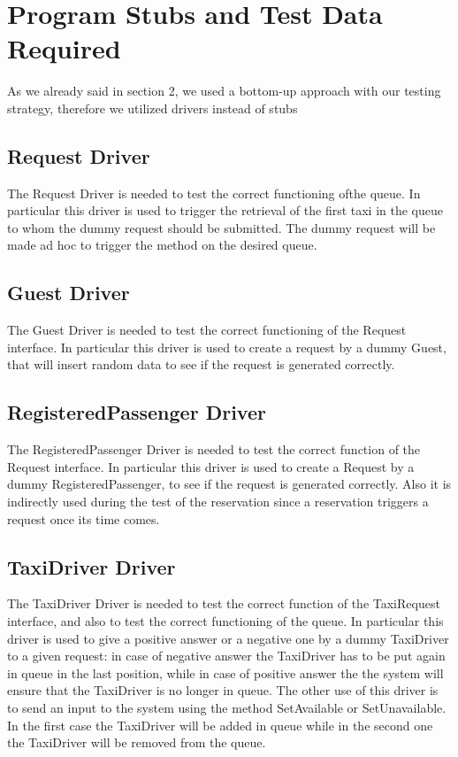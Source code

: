 \section{Program Stubs and Test Data Required}
As we already said in section 2, we used a bottom-up approach with our testing strategy,
therefore we utilized drivers instead of stubs
\subsection{Request Driver}
The Request Driver is needed to test the correct functioning ofthe queue. In particular this driver
is used to trigger the retrieval of the first taxi in the queue to whom the dummy request should be
submitted. The dummy request will be made ad hoc to trigger the method on the desired queue.
\subsection{Guest Driver}
The Guest Driver is needed to test the correct functioning of the Request interface. In particular
this driver is used to create a request by a dummy Guest, that will insert random data to see if the request
is generated correctly.
\subsection{RegisteredPassenger Driver}
The RegisteredPassenger Driver is needed to test the correct function of the Request interface.
In particular this driver is used to create a Request by a dummy RegisteredPassenger,
to see if the request is generated correctly. Also it is indirectly used during the test of
the reservation since a reservation triggers a request once its time comes.
\subsection{TaxiDriver Driver}
The TaxiDriver Driver is needed to test the correct function of the TaxiRequest interface, and also to
test the correct functioning of the queue. In particular this driver is used to give a positive answer or a negative one
by a dummy TaxiDriver to a given request: in case of negative answer the TaxiDriver has to be put again in queue in the last
position, while in case of positive answer the the system will ensure that the TaxiDriver is no longer in queue.
The other use of this driver is to send an input to the system using the method SetAvailable or SetUnavailable. In the first case
the TaxiDriver will be added in queue while in the second one the TaxiDriver will be removed from the queue.
